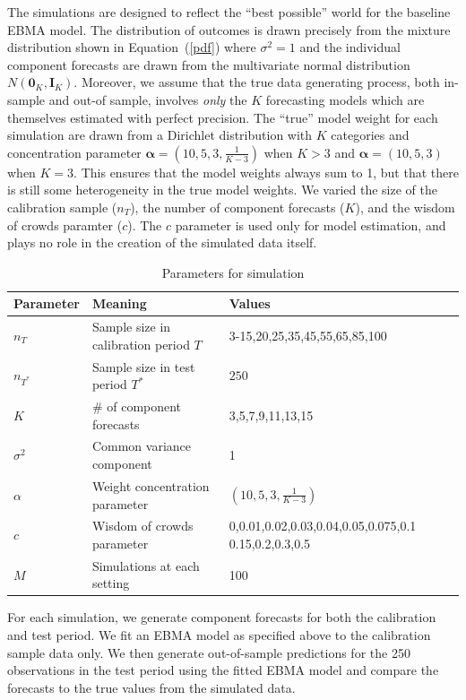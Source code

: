 \documentclass[12pt,fullpage,endnotes]{article}
\begin{document}
The simulations are designed to reflect the ``best possible'' world
for the baseline EBMA model.  The distribution of outcomes is drawn
precisely from the mixture distribution shown in Equation~(\ref{pdf})
where $\sigma^2 = 1$ and the individual component forecasts are drawn
from the multivariate normal distribution $N(\mathbf{0}_K,
\mathbf{I}_K)$.  Moreover, we assume that the true data generating
process, both in-sample and out-of sample, involves \textit{only} the
$K$ forecasting models which are themselves estimated with perfect
precision. The ``true'' model weight for each simulation are drawn
from a Dirichlet distribution with $K$ categories and concentration
parameter $\mathbf{\alpha} = (10, 5, 3, \frac{1}{K-3})$ when $K>3$ and
$\mathbf{\alpha} = (10, 5, 3)$ when $K=3$. This ensures that the
model weights always sum to 1, but that there is still some
heterogeneity in the true model weights.  We varied the size of the
calibration sample ($n_T$), the number of component forecasts ($K$),
and the wisdom of crowds paramter ($c$). The $c$ parameter is used only for
model estimation, and plays no role in the creation of the simulated
data itself.

\begin{table}
  \caption{Parameters for simulation}
\label{params}
\small
\centering

\vspace{.2cm}
\begin{tabular}{lll}
  \toprule
  Parameter & Meaning & Values \\
  \midrule
  $n_{T}$ & Sample size in calibration period $T$  & 3-15,20,25,35,45,55,65,85,100 \\
  $n_{T^\ast}$ &  Sample size in test period $T^\ast$&$250$\\
  $K$ & \# of component forecasts & 3,5,7,9,11,13,15\\
  $\sigma^2$ & Common variance component & 1 \\
  $\alpha$ & Weight concentration parameter  &$ (10, 5, 3, \frac{1}{K-3})$ \\
 $c$ & Wisdom of crowds parameter & 0,0.01,0.02,0.03,0.04,0.05,0.075,0.1 0.15,0.2,0.3,0.5\\
  $M$ & Simulations at each setting & 100 \\
  \bottomrule
\end{tabular}
\end{table}

For each simulation, we generate component forecasts for both the
calibration and test period. We fit an EBMA model as specified above
to the calibration sample data only. We then generate out-of-sample
predictions for the 250 observations in the test period using the
fitted EBMA model and compare the forecasts to the true values from the
simulated data.  
\end{document}
